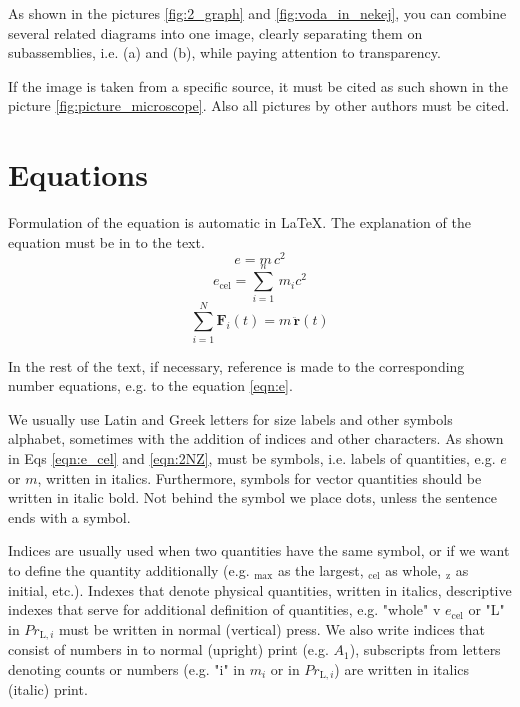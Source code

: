 As shown in the pictures \ref{fig:2_graph} and \ref{fig:voda_in_nekej}, you can
combine several related diagrams into one image, clearly separating them on
subassemblies, i.e. (a) and (b), while paying attention to transparency.

If the image is taken from a specific source, it must be cited as such
shown in the picture \ref{fig:picture_microscope}. Also all pictures by other authors
must be cited.

\section{Equations}\label{sec:equations}

Formulation of the equation is automatic in \LaTeX. The explanation of the equation must be in
to the text.
\begin{equation}\label{eqn:e}
e = m\,c^2
\end{equation}
\begin{equation}\label{eqn:e_cel}
e_{\text{cel}}=\sum_{i=1}^{n}\,m_{i}c^2
\end{equation}
\begin{equation}\label{eqn:2NZ}
	\sum_{i=1}^{N}\bm{F}_i(t)=m\,\ddot{\bm{r}}(t)
\end{equation}

In the rest of the text, if necessary, reference is made to the corresponding number
equations, e.g. to the equation \eqref{eqn:e}.

We usually use Latin and Greek letters for size labels and other symbols
alphabet, sometimes with the addition of indices and other characters. As shown in Eqs
\eqref{eqn:e_cel} and \eqref{eqn:2NZ}, must be symbols, i.e. labels of quantities,
e.g. $e$ or $m$, written in italics. Furthermore, symbols for vector quantities should be written in italic bold. Not behind the symbol
we place dots, unless the sentence ends with a symbol.

Indices are usually used when two quantities have the same symbol, or if
we want to define the quantity additionally (e.g. $_{\text{max}}$ as the largest,
$_{\text{cel}}$ as whole, $_{\text{z}}$ as initial, etc.). Indexes that
denote physical quantities, written in italics, descriptive
indexes that serve for additional definition of quantities, e.g. "whole" v
$e_{\text{cel}}$ or "L" in $Pr_{\text{L},i}$ must be written in normal
(vertical) press. We also write indices that consist of numbers in
to normal (upright) print (e.g. $A_1$), subscripts from letters denoting counts
or numbers (e.g. "i" in $m_i$ or in $Pr_{\text{L},i}$) are written in italics
(italic) print.

